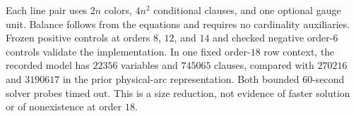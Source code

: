 Each line pair uses $2n$ colors, $4n^2$ conditional clauses, and
one optional gauge unit. Balance follows from the equations and
requires no cardinality auxiliaries. Frozen positive controls at
orders $8$, $12$, and $14$ and checked negative order-$6$ controls
validate the implementation. In one fixed order-$18$ row context,
the recorded model has $22356$ variables and $745065$ clauses,
compared with $270216$ and $3190617$ in the prior physical-arc
representation. Both bounded $60$-second solver probes timed out.
This is a size reduction, not evidence of faster solution or of
nonexistence at order $18$.

